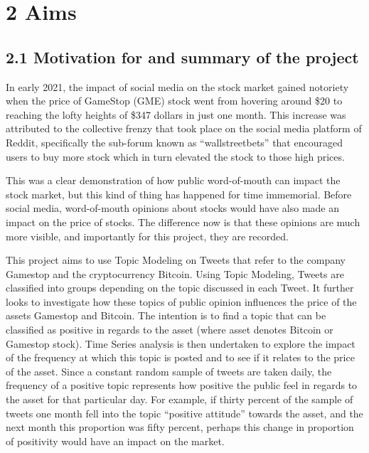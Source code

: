 \documentclass[
]{article}
\begin{document}
\newpage

\hypertarget{aims}{%
\section{2 Aims}\label{aims}}

\hypertarget{motivation-for-and-summary-of-the-project}{%
\subsection{2.1 Motivation for and summary of the
project}\label{motivation-for-and-summary-of-the-project}}

In early 2021, the impact of social media on the stock market gained
notoriety when the price of GameStop (GME) stock went from hovering
around \$20 to reaching the lofty heights of \$347 dollars in just one
month. This increase was attributed to the collective frenzy that took
place on the social media platform of Reddit, specifically the sub-forum
known as ``wallstreetbets'' that encouraged users to buy more stock
which in turn elevated the stock to those high prices.

This was a clear demonstration of how public word-of-mouth can impact
the stock market, but this kind of thing has happened for time
immemorial. Before social media, word-of-mouth opinions about stocks
would have also made an impact on the price of stocks. The difference
now is that these opinions are much more visible, and importantly for
this project, they are recorded.

This project aims to use Topic Modeling on Tweets that refer to the
company Gamestop and the cryptocurrency Bitcoin. Using Topic Modeling,
Tweets are classified into groups depending on the topic discussed in
each Tweet. It further looks to investigate how these topics of public
opinion influences the price of the assets Gamestop and Bitcoin. The
intention is to find a topic that can be classified as positive in
regards to the asset (where asset denotes Bitcoin or Gamestop stock).
Time Series analysis is then undertaken to explore the impact of the
frequency at which this topic is posted and to see if it relates to the
price of the asset. Since a constant random sample of tweets are taken
daily, the frequency of a positive topic represents how positive the
public feel in regards to the asset for that particular day. For
example, if thirty percent of the sample of tweets one month fell into
the topic ``positive attitude'' towards the asset, and the next month
this proportion was fifty percent, perhaps this change in proportion of
positivity would have an impact on the market.
\end{document}
